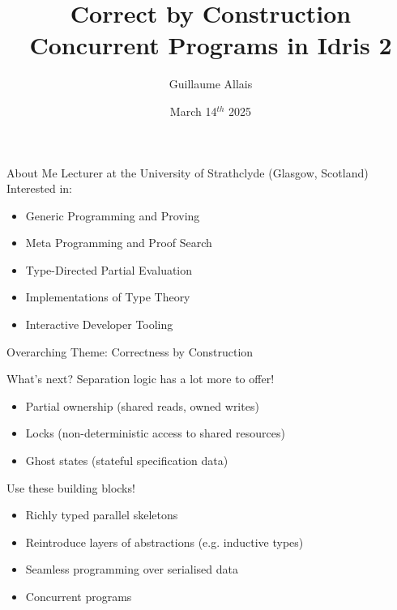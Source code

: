 \documentclass[3to2]{beamer}
\title{Correct by Construction Concurrent Programs \newline in Idris 2}
\author{Guillaume Allais}
\institute{University of Strathclyde \\ Glasgow, UK}
\date{March 14$^{th}$ 2025}
\newcommand{\bobhead}{\texttt{[image: assets/bob.png]}}
\begin{document}
\begin{frame}
  \maketitle
{}
\end{frame}

{
\begin{frame}{About Me}
  Lecturer at the University of Strathclyde (Glasgow, Scotland)
  \vfill
  Interested in:
  \begin{itemize}
    \item Generic Programming and Proving
    \item Meta Programming and Proof Search
    \item Type-Directed Partial Evaluation
    \item Implementations of Type Theory
    \item Interactive Developer Tooling
  \end{itemize}
  \vfill
  Overarching Theme: Correctness by Construction
\end{frame}}






\begin{frame}{What's next?}
Separation logic has a lot more to offer!

  \begin{itemize}
    \item Partial ownership (shared reads, owned writes)
    \item Locks (non-deterministic access to shared resources)
    \item Ghost states (stateful specification data)
  \end{itemize}

\vfill

Use these building blocks!

  \begin{itemize}
    \item Richly typed parallel skeletons
    \item Reintroduce layers of abstractions (e.g. inductive types)
    \item Seamless programming over serialised data
    \item Concurrent programs
  \end{itemize}
\end{frame}
\end{document}
